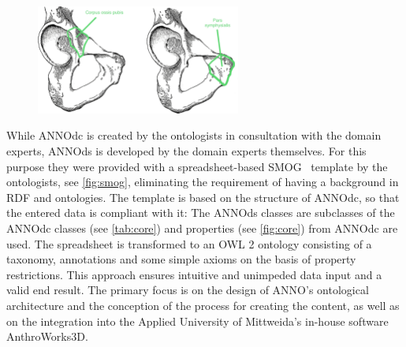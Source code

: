 \documentclass[sw]{iosart2x}
\begin{document}
\begin{figure}
\centering
\includegraphics[width=0.6\textwidth]{img/corpus_ossis_pubis.png}
\caption{}\label{fig:corpus_ossis_pubis}
\end{figure}

While ANNOdc is created by the ontologists in consultation with the domain experts, ANNOds is developed by the domain experts themselves.
For this purpose they were provided with a spreadsheet-based SMOG~\citep{smog} template by the ontologists, see \cref{fig:smog}, eliminating the requirement of having a background in RDF and ontologies.
The template is based on the structure of ANNOdc, so that the entered data is compliant with it: The ANNOds classes are subclasses of the ANNOdc classes (see \cref{tab:core}) and properties (see \cref{fig:core}) from ANNOdc are used.
The spreadsheet is transformed to an OWL 2 ontology consisting of a taxonomy, annotations and some simple axioms on the basis of property restrictions.
This approach ensures intuitive and unimpeded data input and a valid end result.
The primary focus is on the design of ANNO's ontological architecture and the conception of the process for creating the content, as well as on the integration into the Applied University of Mittweida's in-house software AnthroWorks3D.
\end{document}
